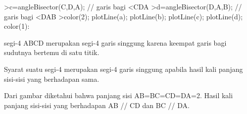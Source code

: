 \documentclass{article}
\begin{document}
\begin{eulernotebook}
\begin{eulercomment}
\begin{eulercomment}
\begin{eulercomment}
\begin{eulercomment}
\begin{eulercomment}
\end{eulercomment}
\begin{eulerprompt}
>c=angleBisector(C,D,A); // garis bagi <CDA
>d=angleBisector(D,A,B); // garis bagi <DAB
>color(2); plotLine(a); plotLine(b); plotLine(c); plotLine(d); color(1):
\end{eulerprompt}
\begin{eulercomment}
segi-4 ABCD merupakan segi-4 garis singgung karena keempat garis bagi
sudutnya bertemu di satu titik.

Syarat suatu segi-4 merupakan segi-4 garis singgung apabila hasil kali
panjang sisi-sisi yang berhadapan sama.

Dari gambar diketahui bahwa panjang sisi AB=BC=CD=DA=2. Hasil kali
panjang sisi-sisi yang berhadapan AB // CD dan BC // DA.


\end{eulercomment}
\end{eulercomment}
\end{eulercomment}
\end{eulercomment}
\end{eulercomment}
\end{eulernotebook}
\end{document}
